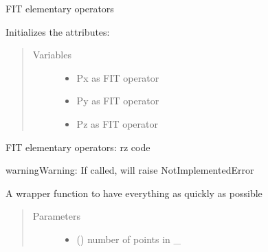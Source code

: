 \documentclass[letterpaper,10pt,english]{sphinxmanual}
\begin{document}
\begin{fulllineitems}
\begin{fulllineitems}
\label{\detokenize{FIT:FIT.FIT.createP}}
FIT elementary operators

Initializes the attributes:
\begin{quote}\begin{description}
\item[{Variables}] \leavevmode\begin{itemize}
\item {} 
 \textendash{} Px as FIT operator

\item {} 
 \textendash{} Py as FIT operator

\item {} 
 \textendash{} Pz as FIT operator

\end{itemize}

\end{description}\end{quote}

\end{fulllineitems}


\begin{fulllineitems}
\label{\detokenize{FIT:FIT.FIT.createPBOR}}
FIT elementary operators: rz code

\begin{sphinxadmonition}{warning}{Warning:}
If called, will raise NotImplementedError
\end{sphinxadmonition}

\end{fulllineitems}


\begin{fulllineitems}
\label{\detokenize{FIT:FIT.FIT.defaultModel}}
A wrapper function to have everything as quickly as possible
\begin{quote}\begin{description}
\item[{Parameters}] \leavevmode\begin{itemize}
\item {} 
 () \textendash{} number of points in \_


\end{itemize}
\end{description}
\end{quote}
\end{fulllineitems}
\end{fulllineitems}
\end{document}
